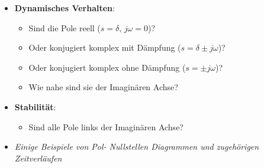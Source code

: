 %
\begin{itemize}
	\item \textbf{Dynamisches Verhalten}: 
		\begin{itemize}
			\item Sind die Pole reell ($s=\delta,\, j\omega = 0$)?
			\item Oder konjugiert komplex mit Dämpfung ($s=\delta\pm j\omega$)?
			\item Oder konjugiert komplex ohne Dämpfung ($s=\pm j\omega$)?
			\item Wie nahe sind sie der Imaginären Achse?
		\end{itemize}
	\item \textbf{Stabilität}: 
		\begin{itemize}
			\item Sind alle Pole links der Imaginären Achse?
		\end{itemize}
\end{itemize}
%
\begin{Aufgaben}{}{}
	\begin{itemize}
		\item \textit{Einige Beispiele von Pol- Nullstellen Diagrammen und zugehörigen Zeitverläufen}
	\end{itemize}
\end{Aufgaben}
%
